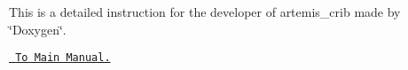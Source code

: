 \label{index_md_doxy_main}%
%
 This is a detailed instruction for the developer of artemis\+\_\+crib made by \char`\"{}\+Doxygen\char`\"{}.

\href{../..}{\texttt{ To Main Manual.}} 